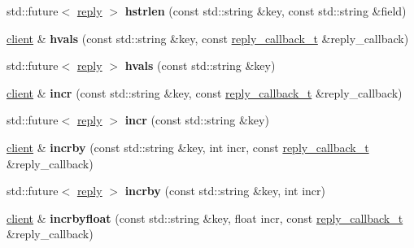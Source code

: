 \begin{DoxyCompactItemize}
std\+::future$<$ \hyperlink{classcpp__redis_1_1reply}{reply} $>$ {\bfseries hstrlen} (const std\+::string \&key, const std\+::string \&field)
\item 
\mbox{\label{classcpp__redis_1_1client_af74a8adbcd6f21178b43f3f2edddb472}} 
\hyperlink{classcpp__redis_1_1client}{client} \& {\bfseries hvals} (const std\+::string \&key, const \hyperlink{classcpp__redis_1_1client_a061a1140d36d2eaeda82b09a0bb3f9f2}{reply\+\_\+callback\+\_\+t} \&reply\+\_\+callback)
\item 
\mbox{\label{classcpp__redis_1_1client_af391940cf5b996a0682e881da446b7da}} 
std\+::future$<$ \hyperlink{classcpp__redis_1_1reply}{reply} $>$ {\bfseries hvals} (const std\+::string \&key)
\item 
\mbox{\label{classcpp__redis_1_1client_a2f9ba6c7e83451207403096b19da4faa}} 
\hyperlink{classcpp__redis_1_1client}{client} \& {\bfseries incr} (const std\+::string \&key, const \hyperlink{classcpp__redis_1_1client_a061a1140d36d2eaeda82b09a0bb3f9f2}{reply\+\_\+callback\+\_\+t} \&reply\+\_\+callback)
\item 
\mbox{\label{classcpp__redis_1_1client_a36ce71119f98cdc29fb29ca33c8b1ff1}} 
std\+::future$<$ \hyperlink{classcpp__redis_1_1reply}{reply} $>$ {\bfseries incr} (const std\+::string \&key)
\item 
\mbox{\label{classcpp__redis_1_1client_a7ee625ebbbfc9fb6f9821b94055e0a5c}} 
\hyperlink{classcpp__redis_1_1client}{client} \& {\bfseries incrby} (const std\+::string \&key, int incr, const \hyperlink{classcpp__redis_1_1client_a061a1140d36d2eaeda82b09a0bb3f9f2}{reply\+\_\+callback\+\_\+t} \&reply\+\_\+callback)
\item 
\mbox{\label{classcpp__redis_1_1client_ab7dbabc00708da38938bb461b195f177}} 
std\+::future$<$ \hyperlink{classcpp__redis_1_1reply}{reply} $>$ {\bfseries incrby} (const std\+::string \&key, int incr)
\item 
\mbox{\label{classcpp__redis_1_1client_a3ae6ca0b7896748a8fe5a450550c422e}} 
\hyperlink{classcpp__redis_1_1client}{client} \& {\bfseries incrbyfloat} (const std\+::string \&key, float incr, const \hyperlink{classcpp__redis_1_1client_a061a1140d36d2eaeda82b09a0bb3f9f2}{reply\+\_\+callback\+\_\+t} \&reply\+\_\+callback)

\end{DoxyCompactItemize}
